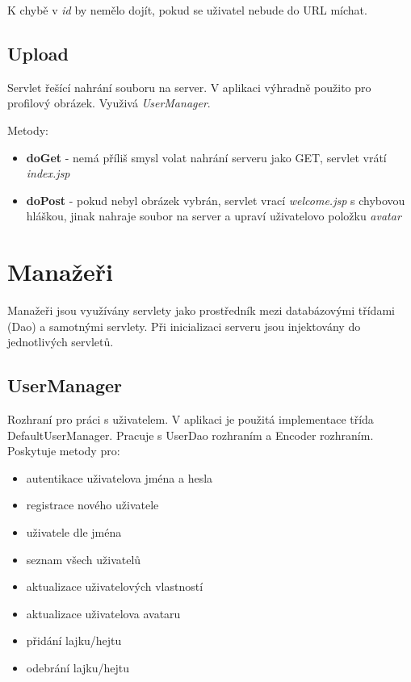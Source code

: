 \documentclass[
12pt,
a4paper,
pdftex,
czech,
titlepage
]{report}
\begin{document}
K chybě v \textit{id} by nemělo dojít, pokud se uživatel nebude do URL míchat.

\subsection{Upload}

Servlet řešící nahrání souboru na server. V aplikaci výhradně použito pro profilový obrázek. Využivá \textit{UserManager}.

Metody:
\begin{itemize}
\item \textbf{doGet} - nemá příliš smysl volat nahrání serveru jako GET, servlet vrátí \textit{index.jsp}
\item \textbf{doPost} - pokud nebyl obrázek vybrán, servlet vrací \textit{welcome.jsp} s chybovou hláškou, jinak nahraje soubor na server a upraví uživatelovo položku \textit{avatar}
\end{itemize}

\section{Manažeři}

Manažeři jsou využívány servlety jako prostředník mezi databázovými třídami (Dao) a samotnými servlety. Při inicializaci serveru jsou injektovány do jednotlivých servletů.

\subsection{UserManager}

Rozhraní pro práci s uživatelem. V aplikaci je použitá implementace třída DefaultUserManager. Pracuje s UserDao rozhraním a Encoder rozhraním. Poskytuje metody pro:

\begin{itemize}
\item autentikace uživatelova jména a hesla
\item registrace nového uživatele
\item uživatele dle jména
\item seznam všech uživatelů
\item aktualizace uživatelových vlastností
\item aktualizace uživatelova avataru
\item přidání lajku/hejtu
\item odebrání lajku/hejtu
\end{itemize}
\end{document}
